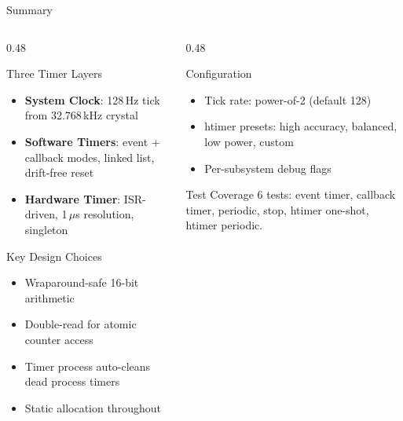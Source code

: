 \documentclass[aspectratio=169, 10pt]{beamer}
\begin{document}
\begin{frame}{Summary}
\begin{columns}[T]
\begin{column}{0.48\textwidth}
\begin{block}{Three Timer Layers}
\begin{itemize}
  \item \textbf{System Clock}: 128\,Hz tick from 32.768\,kHz crystal
  \item \textbf{Software Timers}: event + callback modes, linked list, drift-free reset
  \item \textbf{Hardware Timer}: ISR-driven, 1\,$\mu$s resolution, singleton
\end{itemize}
\end{block}

\begin{block}{Key Design Choices}
\begin{itemize}
  \item Wraparound-safe 16-bit arithmetic
  \item Double-read for atomic counter access
  \item Timer process auto-cleans dead process timers
  \item Static allocation throughout
\end{itemize}
\end{block}
\end{column}

\begin{column}{0.48\textwidth}
\begin{block}{Configuration}
\begin{itemize}
  \item Tick rate: power-of-2 (default 128)
  \item htimer presets: high accuracy, balanced, low power, custom
  \item Per-subsystem debug flags
\end{itemize}
\end{block}

\begin{block}{Test Coverage}
6 tests: event timer, callback timer, periodic, stop, htimer one-shot, htimer periodic.
\end{block}
\end{column}
\end{columns}
\end{frame}
\end{document}

